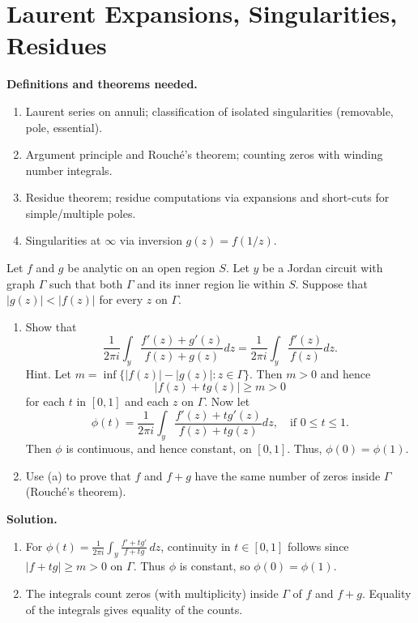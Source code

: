 \section{Laurent Expansions, Singularities, Residues}

\noindent\textbf{Definitions and theorems needed.}
\begin{enumerate}[label=(\alph*)]
\item Laurent series on annuli; classification of isolated singularities (removable, pole, essential).
\item Argument principle and Rouché's theorem; counting zeros with winding number integrals.
\item Residue theorem; residue computations via expansions and short-cuts for simple/multiple poles.
\item Singularities at $\infty$ via inversion $g(z)=f(1/z)$.
\end{enumerate}

\begin{problembox}
Let \( f \) and \( g \) be analytic on an open region \( S \). Let \( y \) be a Jordan circuit with graph \( \Gamma \) such that both \( \Gamma \) and its inner region lie within \( S \). Suppose that \( |g(z)| < |f(z)| \) for every \( z \) on \( \Gamma \).
\begin{enumerate}[label=(\alph*)]
\item Show that
\[ \frac{1}{2\pi i} \int_{y} \frac{f'(z) + g'(z)}{f(z) + g(z)} dz = \frac{1}{2\pi i} \int_{y} \frac{f'(z)}{f(z)} dz. \]
Hint. Let \( m = \inf \{ |f(z)| - |g(z)| : z \in \Gamma \} \). Then \( m > 0 \) and hence
\[ |f(z) + t g(z)| \geq m > 0 \]
for each \( t \) in \( [0, 1] \) and each \( z \) on \( \Gamma \). Now let
\[ \phi(t) = \frac{1}{2\pi i} \int_{y} \frac{f'(z) + t g'(z)}{f(z) + t g(z)} dz, \quad \text{if } 0 \leq t \leq 1. \]
Then \( \phi \) is continuous, and hence constant, on \( [0, 1] \). Thus, \( \phi(0) = \phi(1) \).
\item Use (a) to prove that \( f \) and \( f + g \) have the same number of zeros inside \(\Gamma\) (Rouché's theorem).
\end{enumerate}
\end{problembox}

\noindent\textbf{Solution.}
\begin{enumerate}[label=(\alph*)]
\item For $\phi(t)=\frac{1}{2\pi i}\int_{y}\frac{f'+t g'}{f+tg}\,dz$, continuity in $t\in[0,1]$ follows since $|f+tg|\ge m>0$ on $\Gamma$. Thus $\phi$ is constant, so $\phi(0)=\phi(1)$.
\item The integrals count zeros (with multiplicity) inside $\Gamma$ of $f$ and $f+g$. Equality of the integrals gives equality of the counts.
\end{enumerate}


